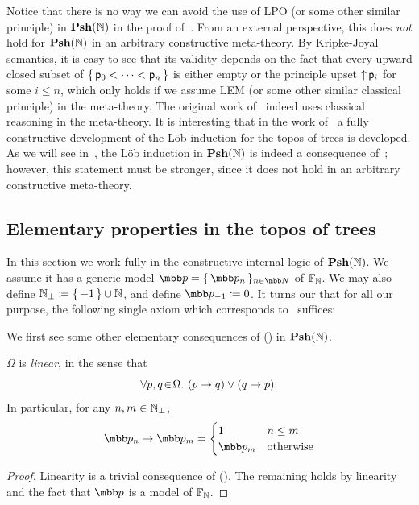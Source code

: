 \begin{remark}
  Notice that there is no way we can avoid the use of \gls{LPO} (or some other similar principle) in $\mathbf{Psh}(\mathbb{N})$ in the proof of~. From an external perspective, this does \emph{not} hold for $\mathbf{Psh}(\mathbb{N})$ in an arbitrary constructive meta-theory. By Kripke-Joyal semantics, it is easy to see that its validity depends on the fact that every upward closed subset of $\{\,\mathsf{p}_0<\cdots<\mathsf{p}_n\,\}$ is either empty or the principle upset $\operatorname{\uparrow} \mathsf{p}_i$ for some $i\le n$, which only holds if we assume \gls{LEM} (or some other similar classical principle) in the meta-theory. The original work of~\citet{birkedal_first_2012} indeed uses classical reasoning in the meta-theory. It is interesting that in the work of~\citet{palombi_classifying_2023} a fully constructive development of the L\"ob induction for the topos of trees is developed. As we will see in~, the L\"ob induction in $\mathbf{Psh}(\mathbb{N})$ is indeed a consequence of~; however, this statement must be stronger, since it does not hold in an arbitrary constructive meta-theory. 
\end{remark}

\subsection{Elementary properties in the topos of trees}

In this section we work fully in the constructive internal logic of $\mathbf{Psh}(\mathbb{N})$. We assume it has a generic model $\mbb p = \set{\mbb p_n}_{n\in\N}$ of $\mathbb{F}_{\mathbb{N}}$. We may also define $\mathbb{N}_\bot \coloneq \{\,-1\,\} \cup \mathbb{N}$, and define $\mbb p_{-1} \coloneq 0$. It turns our that for all our purpose, the following single axiom which corresponds to~ suffices:

\PrintAxiomGR

We first see some other elementary consequences of (\AxiomGR) in $\mathbf{Psh}(\mathbb{N})$.

\begin{lemma}\label{lem:elementaryqcforFN}
  $\Omega$ is \emph{linear}, in the sense that 
  \[ \forall p,q\!\in\!\Omega.\  (p \to q) \vee (q \to p). \]
  In particular, for any $n,m\in\mathbb{N}_\bot$,
  \[
  \mbb p_n \to \mbb p_m = 
  \begin{cases}
    1 & n \le m \\
    \mbb p_m & \other
  \end{cases} 
  \]
\end{lemma}
\begin{proof}
  Linearity is a trivial consequence of (\AxiomGR). The remaining holds by linearity and the fact that $\mbb p$ is a model of $\mathbb{F}_{\mathbb{N}}$.
\end{proof}

